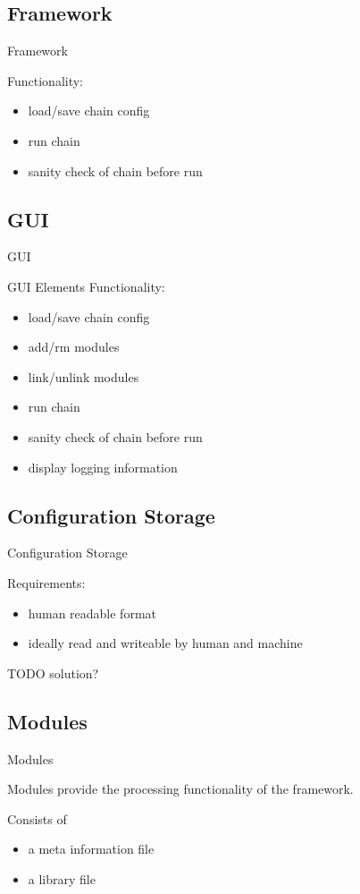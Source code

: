 \documentclass{beamer}
\begin{document}
\subsection{Framework}
\begin{frame}{Framework}

	Functionality:
	\begin{itemize}
		\item load/save chain config
		\item run chain
		\item sanity check of chain before run
	\end{itemize}

\end{frame}

\subsection{GUI}
\begin{frame}{GUI}

	GUI Elements
	Functionality:
	\begin{itemize}
		\item load/save chain config
		\item add/rm modules
 		\item link/unlink modules
  		\item run chain
	 	\item sanity check of chain before run
	 	\item display logging information
	\end{itemize}

\end{frame}

\subsection{Configuration Storage}
\begin{frame}{Configuration Storage}

	Requirements:
	\begin{itemize}
		\item human readable format
		\item ideally read and writeable by human and machine
	\end{itemize}

	TODO solution?


\end{frame}

\subsection{Modules}
\begin{frame}{Modules}

	Modules provide the processing functionality of the framework.

	Consists of
	\begin{itemize}
		\item a meta information file
		\item a library file
	\end{itemize}

\end{frame}
\end{document}
